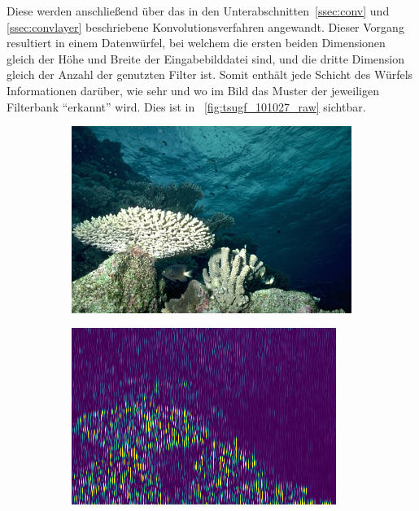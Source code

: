 Diese werden anschließend über das in den Unterabschnitten~\ref{ssec:conv} und \ref{ssec:convlayer} beschriebene Konvolutionsverfahren angewandt. Dieser Vorgang resultiert in einem Datenwürfel, bei welchem die ersten beiden Dimensionen gleich der Höhe und Breite der Eingabebilddatei sind, und die dritte Dimension gleich der Anzahl der genutzten Filter ist. Somit enthält jede Schicht des Würfels Informationen darüber, wie sehr und wo im Bild das Muster der jeweiligen Filterbank \enquote{erkannt} wird. Dies ist in \figurename~\ref{fig:tsugf_101027_raw} sichtbar.

\begin{figure}[h!]
	\begin{subfigure}[t]{0.32\textwidth}
		\centering
		\includegraphics[width=\textwidth,keepaspectratio]{images/bsd/101027.jpg}
		\captionsetup{format=plain}
		\subcaption{}
		\label{fig:bsd_101027}
	\end{subfigure}
	\hfill
	\begin{subfigure}[t]{0.32\textwidth}
		\centering
		\includegraphics[width=\textwidth,keepaspectratio]{images/gen/GEN_tsugf_filterbank_101027_1.png}

\end{subfigure}
\end{figure}
